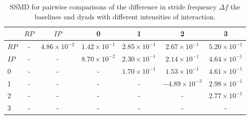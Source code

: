\begin{table}
\centering
\caption{SSMD for pairwise comparisons of the difference in stride frequency $\Delta f$ the baselines and dyads with different intensities of interaction.}
\label{tab:ssmd_delta_f}
\begin{tabular}{lcccccc}
\toprule
 & $RP$ & $IP$ & 0 & 1 & 2 & 3 \\
\midrule
$RP$ & - & $4.86 \times 10^{-2}$ & $1.42 \times 10^{-1}$ & $2.85 \times 10^{-1}$ & $2.67 \times 10^{-1}$ & $5.20 \times 10^{-1}$ \\
$IP$ & - & - & $8.70 \times 10^{-2}$ & $2.30 \times 10^{-1}$ & $2.14 \times 10^{-1}$ & $4.64 \times 10^{-1}$ \\
0 & - & - & - & $1.70 \times 10^{-1}$ & $1.53 \times 10^{-1}$ & $4.61 \times 10^{-1}$ \\
1 & - & - & - & - & $-4.89 \times 10^{-3}$ & $2.98 \times 10^{-1}$ \\
2 & - & - & - & - & - & $2.77 \times 10^{-1}$ \\
3 & - & - & - & - & - & - \\
\bottomrule
\end{tabular}
\end{table}
